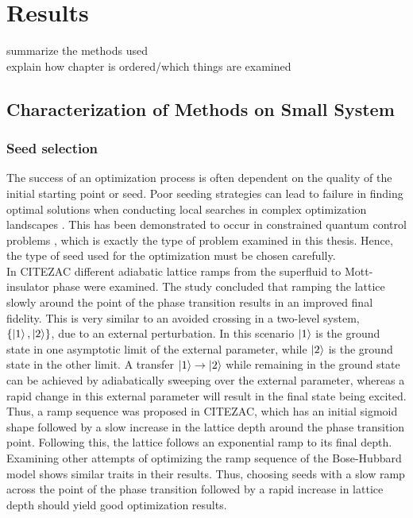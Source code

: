 \chapter{Results}


summarize the methods used \\
explain how chapter is ordered/which things are examined



\section{Characterization of Methods on Small System}

\subsection{Seed selection}
The success of an optimization process is often dependent on the quality of the initial starting point or seed. Poor seeding strategies can lead to failure in finding optimal solutions when conducting local searches in complex optimization landscapes \cite{Sorensen2016}. This has been demonstrated to occur in constrained quantum control problems \cite{Zhdanov2015}, which is exactly the type of problem examined in this thesis. Hence, the type of seed used for the optimization must be chosen carefully.\\ 
In CITEZAC different adiabatic lattice ramps from the superfluid to Mott-insulator phase were examined. The study concluded that ramping the lattice slowly around the point of the phase transition results in an improved final fidelity. This is very similar to an avoided crossing in a two-level system, $\{ \ket{1} , \ket{2} \}$, due to an external perturbation. In this scenario $\ket{1}$ is the ground state in one asymptotic limit of the external parameter, while $\ket{2}$ is the ground state in the other limit. A transfer $\ket{1} \to \ket{2}$ while remaining in the ground state can be achieved by adiabatically sweeping over the external parameter, whereas a rapid change in this external parameter will result in the final state being excited.\\
Thus, a ramp sequence was proposed in CITEZAC, which has an initial sigmoid shape followed by a slow increase in the lattice depth around the phase transition point. Following this, the lattice follows an exponential ramp to its final depth. Examining other attempts of optimizing the ramp sequence of the Bose-Hubbard model \cite{Doria2011,FrankBloch} shows similar traits in their results. Thus, choosing seeds with a slow ramp across the point of the phase transition followed by a rapid increase in lattice depth should yield good optimization results.